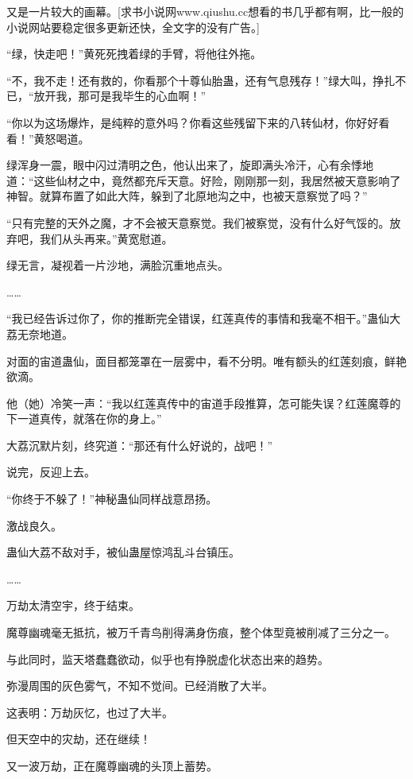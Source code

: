 
\begin{this_body}

又是一片较大的画幕。[求书小说网www.qiushu.cc想看的书几乎都有啊，比一般的小说网站要稳定很多更新还快，全文字的没有广告。]

“绿，快走吧！”黄死死拽着绿的手臂，将他往外拖。

“不，我不走！还有救的，你看那个十尊仙胎蛊，还有气息残存！”绿大叫，挣扎不已，“放开我，那可是我毕生的心血啊！”

“你以为这场爆炸，是纯粹的意外吗？你看这些残留下来的八转仙材，你好好看看！”黄怒喝道。

绿浑身一震，眼中闪过清明之色，他认出来了，旋即满头冷汗，心有余悸地道：“这些仙材之中，竟然都充斥天意。好险，刚刚那一刻，我居然被天意影响了神智。就算布置了如此大阵，躲到了北原地沟之中，也被天意察觉了吗？”

“只有完整的天外之魔，才不会被天意察觉。我们被察觉，没有什么好气馁的。放弃吧，我们从头再来。”黄宽慰道。

绿无言，凝视着一片沙地，满脸沉重地点头。

……

“我已经告诉过你了，你的推断完全错误，红莲真传的事情和我毫不相干。”蛊仙大荔无奈地道。

对面的宙道蛊仙，面目都笼罩在一层雾中，看不分明。唯有额头的红莲刻痕，鲜艳欲滴。

他（她）冷笑一声：“我以红莲真传中的宙道手段推算，怎可能失误？红莲魔尊的下一道真传，就落在你的身上。”

大荔沉默片刻，终究道：“那还有什么好说的，战吧！”

说完，反迎上去。

“你终于不躲了！”神秘蛊仙同样战意昂扬。

激战良久。

蛊仙大荔不敌对手，被仙蛊屋惊鸿乱斗台镇压。

……

万劫太清空宇，终于结束。

魔尊幽魂毫无抵抗，被万千青鸟削得满身伤痕，整个体型竟被削减了三分之一。

与此同时，监天塔蠢蠢欲动，似乎也有挣脱虚化状态出来的趋势。

弥漫周围的灰色雾气，不知不觉间。已经消散了大半。

这表明：万劫灰忆，也过了大半。

但天空中的灾劫，还在继续！

又一波万劫，正在魔尊幽魂的头顶上蓄势。


\end{this_body}

